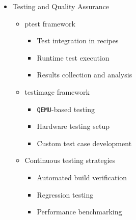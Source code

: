 \documentclass[
]{article}
\providecommand{\tightlist}{%
  \setlength{\itemsep}{0pt}\setlength{\parskip}{0pt}}
\begin{document}
\begin{itemize}
\begin{itemize}
\begin{itemize}
      \begin{itemize}
      \tightlist
      \item
        \texttt{Docker}/\texttt{OCI} image creation
      \item
        Minimal container images
      \item
        Multi-stage builds
      \end{itemize}
    \item
      Multi-configuration builds

      \begin{itemize}
      \tightlist
      \item
        Multiconfig syntax and usage
      \item
        Building for multiple machines
      \item
        Container and VM combinations
      \end{itemize}
    \end{itemize}
  \item
    Testing and Quality Assurance

    \begin{itemize}
    \tightlist
    \item
      ptest framework

      \begin{itemize}
      \tightlist
      \item
        Test integration in recipes
      \item
        Runtime test execution
      \item
        Results collection and analysis
      \end{itemize}
    \item
      testimage framework

      \begin{itemize}
      \tightlist
      \item
        \texttt{QEMU}-based testing
      \item
        Hardware testing setup
      \item
        Custom test case development
      \end{itemize}
    \item
      Continuous testing strategies

      \begin{itemize}
      \tightlist
      \item
        Automated build verification
      \item
        Regression testing
      \item
        Performance benchmarking
      \end{itemize}
    \end{itemize}
  \end{itemize}
\end{itemize}
\end{document}
